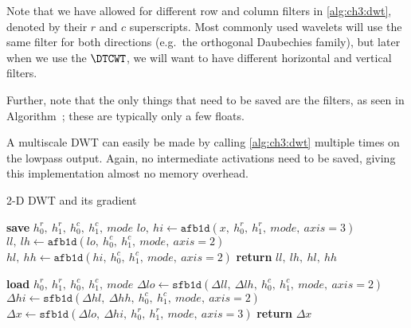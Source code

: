 Note that we have allowed for different row and column
filters in \autoref{alg:ch3:dwt}, denoted by their $r$ and $c$ superscripts. 
Most commonly used wavelets will use the same
filter for both directions (e.g.\ the orthogonal Daubechies family), but later
when we use the $\DTCWT$, we will want to have different horizontal and vertical
filters.

Further, note that the only things that
need to be saved are the filters, as seen in
Algorithm~; these are typically only a
few floats.

A multiscale DWT can easily be made by calling \autoref{alg:ch3:dwt}
multiple times on the lowpass output. Again, no intermediate activations need to be
saved, giving this implementation almost no memory overhead.

\begin{algorithm}[tb]
\caption{2-D DWT and its gradient}\label{alg:ch3:dwt}
\begin{algorithmic}[1]
  \State \textbf{save} $h_0^r,\ h_1^r,\ h_0^c,\ h_1^c,\ mode$  \label{line:ch3:dwt_save}
  \State $lo,\ hi \gets \mathtt{afb1d}(x,\ h_0^r,\ h_1^r,\ mode,\ axis=3)$ 
  \State $ll,\ lh \gets \mathtt{afb1d}(lo,\ h_0^c,\ h_1^c,\ mode,\ axis=2)$ 
  \State $hl,\ hh \gets \mathtt{afb1d}(hi,\ h_0^c,\ h_1^c,\ mode,\ axis=2)$ 
  \State \textbf{return} $ll,\ lh,\ hl,\ hh$
\EndFunction
\end{algorithmic}\vspace{10pt}
\begin{algorithmic}[1]
  \State \textbf{load} $h_0^r,\ h_1^r,\ h_0^c,\ h_1^c,\ mode$
  \State $\Delta lo \gets \mathtt{sfb1d}(\Delta ll,\ \Delta lh,\ h_0^c,\ h_1^c,\ mode,\ axis=2) $
  \State $\Delta hi \gets \mathtt{sfb1d}(\Delta hl,\ \Delta hh,\ h_0^c,\ h_1^c,\ mode,\ axis=2) $
  \State $\Delta x \gets \mathtt{sfb1d}(\Delta lo,\ \Delta hi,\ h_0^r,\ h_1^r,\ mode,\ axis=3) $
  \State \textbf{return} $\Delta x$
\EndFunction
\end{algorithmic}
\end{algorithm}

